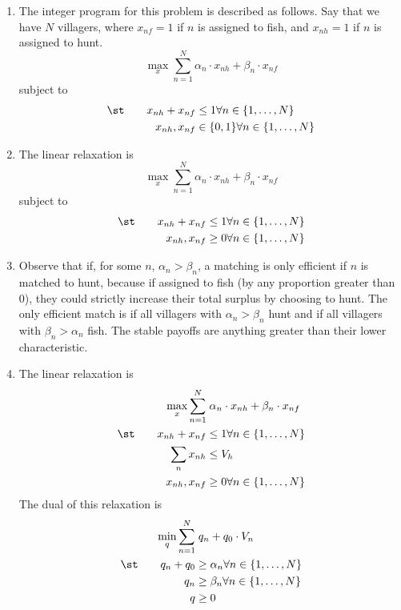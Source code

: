 \documentclass[10pt]{article}
\begin{document}
\maketitle

\begin{enumerate}
	\item The integer program for this problem is described as follows. Say that we have $N$ villagers, where $x_{nf} = 1$ if $n$ is assigned to fish, and $x_{nh} = 1$ if $n$ is assigned to hunt. \[\max_x \sum_{n=1}^N \alpha_n \cdot x_{nh} + \beta_n \cdot x_{nf} \]subject to\begin{align*} \st \qquad x_{nh}+x_{nf} &\le 1 \forall n \in \{1,\dots,N\} \\ x_{nh},x_{nf} &\in \{0,1\} \forall n\in \{1,\dots,N\}\end{align*}
	\item The linear relaxation is\[\max_x \sum_{n=1}^N \alpha_n \cdot x_{nh} + \beta_n \cdot x_{nf} \]subject to\begin{align*} \st \qquad x_{nh}+x_{nf} &\le 1 \forall n \in \{1,\dots,N\} \\ x_{nh},x_{nf} &\ge 0 \forall n\in \{1,\dots,N\}\end{align*}
	\item Observe that if, for some $n$, $\alpha_n > \beta_n$, a matching is only efficient if $n$ is matched to hunt, because if assigned to fish (by any proportion greater than 0), they could strictly increase their total surplus by choosing to hunt. The only efficient match is if all villagers with $\alpha_n > \beta_n$ hunt and if all villagers with $\beta_n > \alpha_n$ fish. The stable payoffs are anything greater than their lower characteristic.
	\item The linear relaxation is \begin{align*}\max_x \sum_{n=1}^N&\; \alpha_n \cdot x_{nh} + \beta_n \cdot x_{nf}\\ \st \qquad x_{nh}+x_{nf} &\le 1 \forall n \in \{1,\dots,N\} \\ \sum_n x_{nh} &\le V_h \\ x_{nh},x_{nf} &\ge 0 \forall n\in \{1,\dots,N\}\end{align*}The dual of this relaxation is \begin{align*}\min_q \sum_{n=1}^N &\; q_n + q_0 \cdot V_n \\ \st \qquad q_n + q_0 &\ge \alpha_n \forall n \in \{1,\dots,N\} \\ q_n &\ge \beta_n \forall n \in \{1,\dots,N\} \\ q &\ge 0\end{align*}

\end{enumerate}
\end{document}
